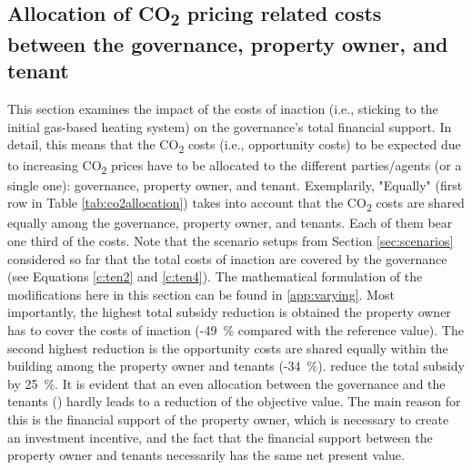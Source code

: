 \subsection{Allocation of CO\textsubscript{2} pricing related costs between the governance, property owner, and tenant}\label{res:co2_shares}
This section examines the impact of the costs of inaction (i.e., sticking to the initial gas-based heating system) on the governance's total financial support. In detail, this means that the CO\textsubscript{2} costs (i.e., opportunity costs) to be expected due to increasing CO\textsubscript{2} prices have to be allocated to the different parties/agents (or a single one): governance, property owner, and tenant.  Exemplarily, "Equally" (first row in Table \ref{tab:co2allocation}) takes into account that the CO\textsubscript{2} costs are shared equally among the governance, property owner, and tenants. Each of them bear one third of the costs. Note that the scenario setups from Section \ref{sec:scenarios}  considered so far that the total costs of inaction are covered by the governance (see Equations \ref{c:ten2} and \ref{c:ten4}). The mathematical formulation of the modifications here in this section can be found in \ref{app:varying}. Most importantly, the highest total subsidy reduction is obtained  the property owner has to cover the costs of inaction (-\SI{49}{\%} compared with the reference value). The second highest reduction is  the opportunity costs are shared equally within the building among the property owner and tenants (-\SI{34}{\%}).  reduce the total subsidy by \SI{25}{\%}.  It is evident that an even allocation between the governance and the tenants () hardly leads to a reduction of the objective value. The main reason for this is the financial support of the property owner, which is necessary to create an investment incentive, and the fact that the financial support between the property owner and tenants necessarily has the same net present value.\vspace{0.5cm}

